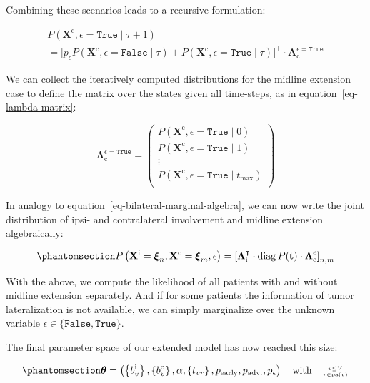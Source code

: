 \documentclass[
  sn-mathphys-num,
]{sn-jnl}
\begin{document}
Combining these scenarios leads to a recursive formulation:

\[
\begin{multlined}
P \left( \mathbf{X}^\text{c}, \epsilon=\texttt{True} \mid \tau + 1 \right) \\
= \big[ p_\epsilon P \left( \mathbf{X}^\text{c}, \epsilon=\texttt{False} \mid \tau \right) + P \left( \mathbf{X}^\text{c}, \epsilon=\texttt{True} \mid \tau \right) \big]^\top \cdot \mathbf{A}_\text{c}^{\epsilon=\texttt{True}}
\end{multlined}
\]

We can collect the iteratively computed distributions for the midline
extension case to define the matrix over the states given all
time-steps, as in equation~\ref{eq-lambda-matrix}:

\[
\boldsymbol{\Lambda}_\text{c}^{\epsilon=\texttt{True}} = \begin{pmatrix}
P \left( \mathbf{X}^\text{c}, \epsilon=\texttt{True} \mid 0 \right) \\
P \left( \mathbf{X}^\text{c}, \epsilon=\texttt{True} \mid 1 \right) \\
\vdots \\
P \left( \mathbf{X}^\text{c}, \epsilon=\texttt{True} \mid t_\text{max} \right) \\
\end{pmatrix}
\]

In analogy to equation~\ref{eq-bilateral-marginal-algebra}, we can now
write the joint distribution of ipsi- and contralateral involvement and
midline extension algebraically:

\begin{equation}\phantomsection\label{eq-midline-marginal-algebra}{
P \left( \mathbf{X}^\text{i} = \boldsymbol{\xi}_n, \mathbf{X}^\text{c} = \boldsymbol{\xi}_m, \epsilon \right) = \left[ \boldsymbol{\Lambda}^\intercal_\text{i} \cdot \operatorname{diag} P(\mathbf{t}) \cdot \boldsymbol{\Lambda}_\text{c}^\epsilon \right]_{n,m}
}\end{equation}

With the above, we compute the likelihood of all patients with and
without midline extension separately. And if for some patients the
information of tumor lateralization is not available, we can simply
marginalize over the unknown variable
\(\epsilon \in \{ \texttt{False}, \texttt{True} \}\).

The final parameter space of our extended model has now reached this
size:

\begin{equation}\phantomsection\label{eq-ext-param-space}{
\boldsymbol{\theta} = \left( \left\{ b_v^\text{i} \right\}, \left\{ b_v^\text{c} \right\}, \alpha, \left\{ t_{vr} \right\}, p_\text{early}, p_\text{adv.}, p_\epsilon \right) \quad \text{with} \quad \genfrac{}{}{0pt}{2}{v\leq V}{r\in\operatorname{pa}(v)}
}\end{equation}
\end{document}
